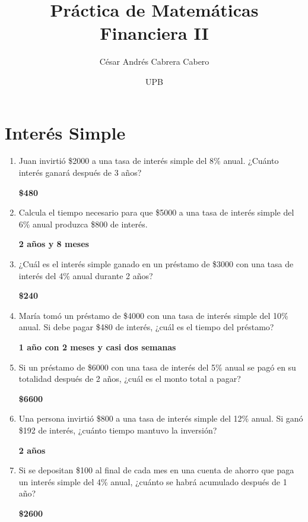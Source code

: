 \documentclass{article}
\begin{document}
\title{Práctica de Matemáticas Financiera II}
\author{César Andrés Cabrera Cabero}
\date{UPB}
\maketitle

\section{Interés Simple}

\begin{enumerate}
    \item Juan invirtió \$2000 a una tasa de interés simple del 8\% anual. ¿Cuánto interés ganará después de 3 años?
    
    \textbf{\$480}
    
    \item Calcula el tiempo necesario para que \$5000 a una tasa de interés simple del 6\% anual produzca \$800 de interés.
    
    \textbf{2 años y 8 meses}
    
    \item ¿Cuál es el interés simple ganado en un préstamo de \$3000 con una tasa de interés del 4\% anual durante 2 años?
    
    \textbf{\$240}
    
    \item María tomó un préstamo de \$4000 con una tasa de interés simple del 10\% anual. Si debe pagar \$480 de interés, ¿cuál es el tiempo del préstamo?
    
    \textbf{1 año con 2 meses y casi dos semanas}
    
    \item Si un préstamo de \$6000 con una tasa de interés del 5\% anual se pagó en su totalidad después de 2 años, ¿cuál es el monto total a pagar?
    
    \textbf{\$6600}
    
    \item Una persona invirtió \$800 a una tasa de interés simple del 12\% anual. Si ganó \$192 de interés, ¿cuánto tiempo mantuvo la inversión?
    
    \textbf{2 años}
    
    \item Si se depositan \$100 al final de cada mes en una cuenta de ahorro que paga un interés simple del 4\% anual, ¿cuánto se habrá acumulado después de 1 año?
    
    \textbf{\$2600}
    

\end{enumerate}
\end{document}
